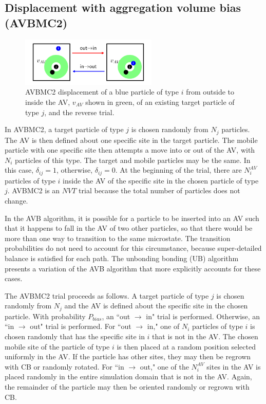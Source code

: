 \documentclass[
  9pt,
  bestpractices,
]{livecoms}
\begin{document}
\subsection{\label{sec:lhs_disp_avb2}Displacement with aggregation volume bias (AVBMC2)}

\begin{figure}
\begin{centering}
\includegraphics[width=6.5cm]{../figures/avb2.pdf}
\caption{
AVBMC2 displacement of a blue particle of type $i$ from outside to inside the AV, $v_{AV}$ shown in green, of an existing target particle of type $j$, and the reverse trial.
}
\label{fig:avbmc2}
\end{centering}
\end{figure}

In AVBMC2, a target particle of type $j$ is chosen randomly from $N_j$ particles.
The AV is then defined about one specific site in the target particle.
The mobile particle with one specific site then attempts a move into or out of the AV, with $N_i$ particles of this type.
The target and mobile particles may be the same.
In this case, $\delta_{ij}=1$, otherwise, $\delta_{ij}=0$.
At the beginning of the trial, there are $N_i^{AV}$ particles of type $i$ inside the AV of the specific site in the chosen particle of type $j$.
AVBMC2 is an $NVT$ trial because the total number of particles does not change.

In the AVB algorithm, it is possible for a particle to be inserted into an AV such that it happens to fall in the AV of two other particles, so that there would be more than one way to transition to the same microstate.
The transition probabilities do not need to account for this circumstance, because super-detailed balance is satisfied for each path.
The unbonding bonding (UB) algorithm \cite{wierzchowski_general-purpose_2001} presents a variation of the AVB algorithm that more explicitly accounts for these cases.

The AVBMC2 trial proceeds as follows.
A target particle of type $j$ is chosen randomly from $N_j$ and the AV is defined about the specific site in the chosen particle.
With probability $P_{bias}$, an ``out $\rightarrow$ in" trial is performed.
Otherwise, an ``in $\rightarrow$ out" trial is performed.
For ``out $\rightarrow$ in," one of $N_i$ particles of type $i$ is chosen randomly that has the specific site in $i$ that is not in the AV.
The chosen mobile site of the particle of type $i$ is then placed at a random position selected uniformly in the AV.
If the particle has other sites, they may then be regrown with CB or randomly rotated.
For ``in $\rightarrow$ out," one of the $N_i^{AV}$ sites in the AV is placed randomly in the entire simulation domain that is not in the AV.
Again, the remainder of the particle may then be oriented randomly or regrown with CB.
\end{document}
